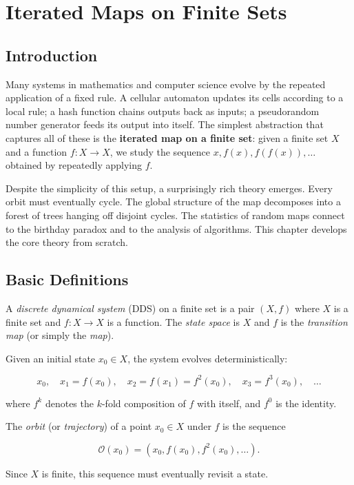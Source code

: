 \chapter{Iterated Maps on Finite Sets}

\section{Introduction}

Many systems in mathematics and computer science evolve by the repeated application of a fixed rule. A cellular automaton updates its cells according to a local rule; a hash function chains outputs back as inputs; a pseudorandom number generator feeds its output into itself. The simplest abstraction that captures all of these is the \textbf{iterated map on a finite set}: given a finite set $X$ and a function $f: X \to X$, we study the sequence $x, f(x), f(f(x)), \ldots$ obtained by repeatedly applying $f$.

Despite the simplicity of this setup, a surprisingly rich theory emerges. Every orbit must eventually cycle. The global structure of the map decomposes into a forest of trees hanging off disjoint cycles. The statistics of random maps connect to the birthday paradox and to the analysis of algorithms. This chapter develops the core theory from scratch.

\section{Basic Definitions}

\begin{definition}
A \textit{discrete dynamical system} (DDS) on a finite set is a pair $(X, f)$ where $X$ is a finite set and $f: X \to X$ is a function. The \textit{state space} is $X$ and $f$ is the \textit{transition map} (or simply the \textit{map}).

Given an initial state $x_0 \in X$, the system evolves deterministically:

\[x_0, \quad x_1 = f(x_0), \quad x_2 = f(x_1) = f^2(x_0), \quad x_3 = f^3(x_0), \quad \ldots\]

where $f^k$ denotes the $k$-fold composition of $f$ with itself, and $f^0$ is the identity.
\end{definition}

\begin{definition}[Orbit]
The \textit{orbit} (or \textit{trajectory}) of a point $x_0 \in X$ under $f$ is the sequence

\[\mathcal{O}(x_0) = (x_0, f(x_0), f^2(x_0), \ldots).\]

Since $X$ is finite, this sequence must eventually revisit a state.
\end{definition}

